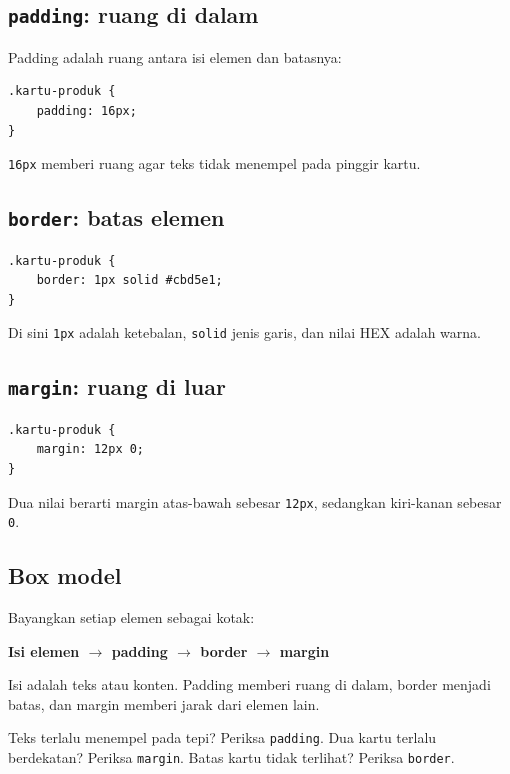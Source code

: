 \documentclass[11pt,a4paper]{article}
\begin{document}
\subsection{\texttt{padding}: ruang di dalam}
Padding adalah ruang antara isi elemen dan batasnya:
\begin{lstlisting}
.kartu-produk {
    padding: 16px;
}
\end{lstlisting}
\texttt{16px} memberi ruang agar teks tidak menempel pada pinggir kartu.

\subsection{\texttt{border}: batas elemen}
\begin{lstlisting}
.kartu-produk {
    border: 1px solid #cbd5e1;
}
\end{lstlisting}
Di sini \texttt{1px} adalah ketebalan, \texttt{solid} jenis garis, dan nilai HEX adalah warna.

\subsection{\texttt{margin}: ruang di luar}
\begin{lstlisting}
.kartu-produk {
    margin: 12px 0;
}
\end{lstlisting}
Dua nilai berarti margin atas-bawah sebesar \texttt{12px}, sedangkan kiri-kanan sebesar \texttt{0}.

\subsection{Box model}
Bayangkan setiap elemen sebagai kotak:
\begin{center}
\textbf{Isi elemen $\rightarrow$ padding $\rightarrow$ border $\rightarrow$ margin}
\end{center}
Isi adalah teks atau konten. Padding memberi ruang di dalam, border menjadi batas, dan margin memberi jarak dari elemen lain.
\begin{ingat}
Teks terlalu menempel pada tepi? Periksa \texttt{padding}. Dua kartu terlalu berdekatan? Periksa \texttt{margin}. Batas kartu tidak terlihat? Periksa \texttt{border}.
\end{ingat}
\end{document}
